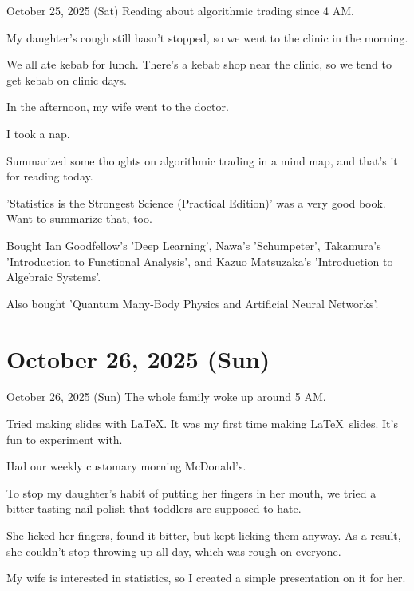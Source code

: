 \documentclass[dvipdfmx, autodetect-engine, aspectratio=169, 10.5pt]{beamer}
\begin{document}
\begin{frame}{October 25, 2025 (Sat)}
Reading about algorithmic trading since 4 AM.

My daughter's cough still hasn't stopped, so we went to the clinic in the morning.

We all ate kebab for lunch.
There's a kebab shop near the clinic, so we tend to get kebab on clinic days.

In the afternoon, my wife went to the doctor.

I took a nap.

Summarized some thoughts on algorithmic trading in a mind map, and that's it for reading today.

'Statistics is the Strongest Science (Practical Edition)' was a very good book. Want to summarize that, too.

Bought Ian Goodfellow's 'Deep Learning', Nawa's 'Schumpeter', Takamura's 'Introduction to Functional Analysis', and Kazuo Matsuzaka's 'Introduction to Algebraic Systems'.

Also bought 'Quantum Many-Body Physics and Artificial Neural Networks'.
\end{frame}

\section{October 26, 2025 (Sun)}

\begin{frame}{October 26, 2025 (Sun)}
The whole family woke up around 5 AM.

Tried making slides with \LaTeX.
It was my first time making \LaTeX\ slides. It's fun to experiment with.

Had our weekly customary morning McDonald's.

To stop my daughter's habit of putting her fingers in her mouth, we tried a bitter-tasting nail polish that toddlers are supposed to hate.

She licked her fingers, found it bitter, but kept licking them anyway. As a result, she couldn't stop throwing up all day, which was rough on everyone.

My wife is interested in statistics, so I created a simple presentation on it for her.
\end{frame}
\end{document}
